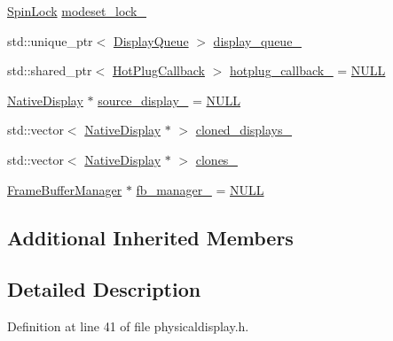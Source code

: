\begin{DoxyCompactItemize}
\item 
\mbox{\hyperlink{classhwcomposer_1_1SpinLock}{Spin\+Lock}} \mbox{\hyperlink{classhwcomposer_1_1PhysicalDisplay_a6af6dc9958e383376e61c721869339f6}{modeset\+\_\+lock\+\_\+}}
\item 
std\+::unique\+\_\+ptr$<$ \mbox{\hyperlink{classhwcomposer_1_1DisplayQueue}{Display\+Queue}} $>$ \mbox{\hyperlink{classhwcomposer_1_1PhysicalDisplay_a64283661ac59ad590ecbbe828e969b86}{display\+\_\+queue\+\_\+}}
\item 
std\+::shared\+\_\+ptr$<$ \mbox{\hyperlink{classhwcomposer_1_1HotPlugCallback}{Hot\+Plug\+Callback}} $>$ \mbox{\hyperlink{classhwcomposer_1_1PhysicalDisplay_aca921bd8eb098023a65d9280dcc8fbec}{hotplug\+\_\+callback\+\_\+}} = \mbox{\hyperlink{alios_2platformdefines_8h_a070d2ce7b6bb7e5c05602aa8c308d0c4}{N\+U\+LL}}
\item 
\mbox{\hyperlink{classhwcomposer_1_1NativeDisplay}{Native\+Display}} $\ast$ \mbox{\hyperlink{classhwcomposer_1_1PhysicalDisplay_ad0fce5567e675b70d8f9f127929453a3}{source\+\_\+display\+\_\+}} = \mbox{\hyperlink{alios_2platformdefines_8h_a070d2ce7b6bb7e5c05602aa8c308d0c4}{N\+U\+LL}}
\item 
std\+::vector$<$ \mbox{\hyperlink{classhwcomposer_1_1NativeDisplay}{Native\+Display}} $\ast$ $>$ \mbox{\hyperlink{classhwcomposer_1_1PhysicalDisplay_a646651bb227f0d0c18317a864d36d767}{cloned\+\_\+displays\+\_\+}}
\item 
std\+::vector$<$ \mbox{\hyperlink{classhwcomposer_1_1NativeDisplay}{Native\+Display}} $\ast$ $>$ \mbox{\hyperlink{classhwcomposer_1_1PhysicalDisplay_ab56848042a1534cdd00730e679350b95}{clones\+\_\+}}
\item 
\mbox{\hyperlink{classhwcomposer_1_1FrameBufferManager}{Frame\+Buffer\+Manager}} $\ast$ \mbox{\hyperlink{classhwcomposer_1_1PhysicalDisplay_afd057257acfb8801ece8f51d9d7a7abe}{fb\+\_\+manager\+\_\+}} = \mbox{\hyperlink{alios_2platformdefines_8h_a070d2ce7b6bb7e5c05602aa8c308d0c4}{N\+U\+LL}}
\end{DoxyCompactItemize}
\subsection*{Additional Inherited Members}


\subsection{Detailed Description}


Definition at line 41 of file physicaldisplay.\+h.



